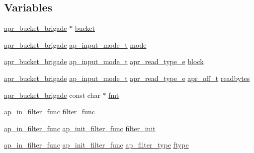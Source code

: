 \subsection*{Variables}
\begin{DoxyCompactItemize}
\item 
\hyperlink{structapr__bucket__brigade}{apr\+\_\+bucket\+\_\+brigade} $\ast$ \hyperlink{group__APACHE__CORE__FILTER_ga6550e0bd0ee31e160be60d67874dbcbc}{bucket}
\item 
\hyperlink{structapr__bucket__brigade}{apr\+\_\+bucket\+\_\+brigade} \hyperlink{util__filter_8h_ab570898d09fbbe5b6d838e28b90134e0}{ap\+\_\+input\+\_\+mode\+\_\+t} \hyperlink{group__APACHE__CORE__FILTER_gad194431669b7d1f96d2dacfb7be21261}{mode}
\item 
\hyperlink{structapr__bucket__brigade}{apr\+\_\+bucket\+\_\+brigade} \hyperlink{util__filter_8h_ab570898d09fbbe5b6d838e28b90134e0}{ap\+\_\+input\+\_\+mode\+\_\+t} \hyperlink{group__APR__Util__Bucket__Brigades_ga756973fb6392bd1026c3d96b4519776d}{apr\+\_\+read\+\_\+type\+\_\+e} \hyperlink{group__APACHE__CORE__FILTER_gafe0ebf200b97a61a45c0513334da9ab6}{block}
\item 
\hyperlink{structapr__bucket__brigade}{apr\+\_\+bucket\+\_\+brigade} \hyperlink{util__filter_8h_ab570898d09fbbe5b6d838e28b90134e0}{ap\+\_\+input\+\_\+mode\+\_\+t} \hyperlink{group__APR__Util__Bucket__Brigades_ga756973fb6392bd1026c3d96b4519776d}{apr\+\_\+read\+\_\+type\+\_\+e} \hyperlink{group__apr__platform_ga6938af9075cec15c88299109381aa984}{apr\+\_\+off\+\_\+t} \hyperlink{group__APACHE__CORE__FILTER_ga0ce3dc88443223a04b0d1a3167356aee}{readbytes}
\item 
\hyperlink{structapr__bucket__brigade}{apr\+\_\+bucket\+\_\+brigade} const char $\ast$ \hyperlink{group__APACHE__CORE__FILTER_ga65068f17c9b43943b73a93544b9a7b35}{fmt}
\item 
\hyperlink{group__APACHE__CORE__FILTER_ga8e6e76deedf9ef3e3a4aa33419663875}{ap\+\_\+in\+\_\+filter\+\_\+func} \hyperlink{group__APACHE__CORE__FILTER_ga9b7e5ba838d06e9f7abc6195061b8ab1}{filter\+\_\+func}
\item 
\hyperlink{group__APACHE__CORE__FILTER_ga8e6e76deedf9ef3e3a4aa33419663875}{ap\+\_\+in\+\_\+filter\+\_\+func} \hyperlink{group__APACHE__CORE__FILTER_ga7ecd47b41aacab276198f6d1fc05a56c}{ap\+\_\+init\+\_\+filter\+\_\+func} \hyperlink{group__APACHE__CORE__FILTER_ga0f8d986fdc54b998955d7e7ffe33ca9b}{filter\+\_\+init}
\item 
\hyperlink{group__APACHE__CORE__FILTER_ga8e6e76deedf9ef3e3a4aa33419663875}{ap\+\_\+in\+\_\+filter\+\_\+func} \hyperlink{group__APACHE__CORE__FILTER_ga7ecd47b41aacab276198f6d1fc05a56c}{ap\+\_\+init\+\_\+filter\+\_\+func} \hyperlink{group__APACHE__CORE__FILTER_ga6dc4721ae075c103a3f3a93775d139fa}{ap\+\_\+filter\+\_\+type} \hyperlink{group__APACHE__CORE__FILTER_gaeab66420f0bf5d08ac6c6604830fb243}{ftype}

\end{DoxyCompactItemize}

